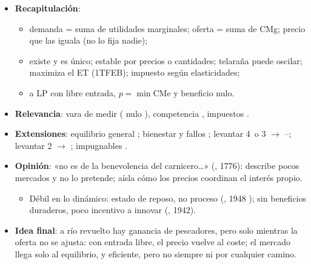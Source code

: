 \documentclass{article}
\begin{document}
\begin{columnas}
\begin{itemize}
\item \textbf{Recapitulación}:
  \begin{itemize}
  \item demanda = suma de utilidades marginales; oferta = suma de CMg; precio que las iguala (no lo fija nadie);
  \item existe y es único; estable por precios o cantidades; telaraña puede oscilar; maximiza el ET (1TFEB); impuesto según elasticidades;
  \item a LP con libre entrada, $p=\min\mathrm{CMe}$ y beneficio nulo.
  \end{itemize}
\item \textbf{Relevancia}: vara de medir ( nulo ), competencia , impuestos .
\item \textbf{Extensiones}: equilibrio general ; bienestar y fallos ; levantar 4~o 3 $\to$ --; levantar 2 $\to$ ; impugnables .
\item \textbf{Opinión}: «no es de la benevolencia del carnicero\ldots{}» (, 1776): describe pocos mercados y no lo pretende; aísla cómo los precios coordinan el interés propio.
  \begin{itemize}
  \item Débil en lo dinámico: estado de reposo, no proceso (, 1948 ); sin beneficios duraderos, poco incentivo a innovar (, 1942).
  \end{itemize}
\item \textbf{Idea final}: a río revuelto hay ganancia de pescadores, pero solo mientras la oferta no se ajusta: con entrada libre, el precio vuelve al coste; el mercado llega solo al equilibrio, y eficiente, pero no siempre ni por cualquier camino.
\end{itemize}


\end{columnas}
\end{document}
